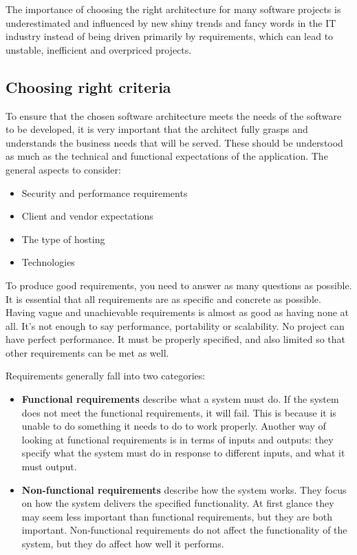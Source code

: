 The importance of choosing the right architecture for many software projects is underestimated and influenced by new shiny trends and fancy words in the IT industry instead of being driven primarily by requirements, which can lead to unstable, inefficient and overpriced projects.

\subsection{Choosing right criteria}
To ensure that the chosen software architecture meets the needs of the software to be developed, it is very important that the architect fully grasps and understands the business needs that will be served. These should be understood as much as the technical and functional expectations of the application. The general aspects to consider:
\begin{itemize}
    \item Security and performance requirements
    \item Client and vendor expectations
    \item The type of hosting
    \item Technologies
\end{itemize}

To produce good requirements, you need to answer as many questions as possible. It is essential that all requirements are as specific and concrete as possible. Having vague and unachievable requirements is almost as good as having none at all. It's not enough to say performance, portability or scalability. No project can have perfect performance. It must be properly specified, and also limited so that other requirements can be met as well\cite{REQUIREMENTS_LIMITED}.

Requirements generally fall into two categories:
\begin{itemize}
    \item \textbf{Functional requirements} describe what a system must do. If the system does not meet the functional requirements, it will fail. This is because it is unable to do something it needs to do to work properly. Another way of looking at functional requirements is in terms of inputs and outputs: they specify what the system must do in response to different inputs, and what it must output.
    \item \textbf{Non-functional requirements} describe how the system works. They focus on how the system delivers the specified functionality. At first glance they may seem less important than functional requirements, but they are both important. Non-functional requirements do not affect the functionality of the system, but they do affect how well it performs.
\end{itemize}

